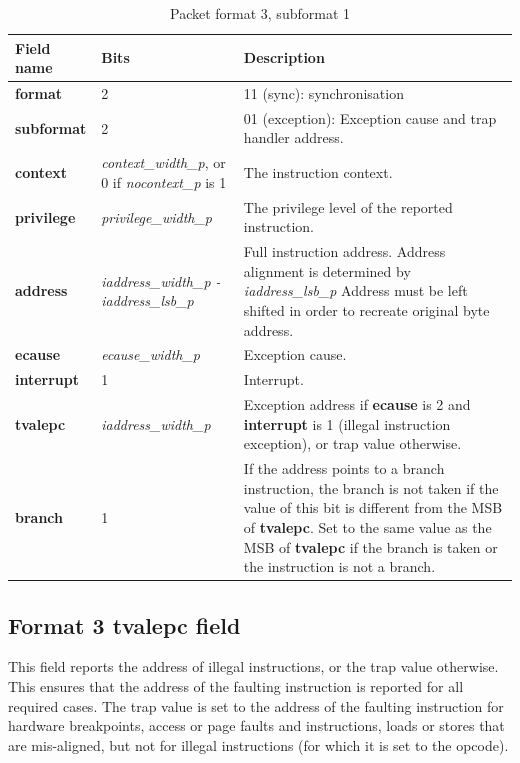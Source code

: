 \begin{table}[htp]
  \centering
  \caption{Packet format 3, subformat 1}
  \label{tab:te_inst3}
  \begin{tabulary}{\textwidth}{|l|p{35mm}|p{90mm}|}
    \hline
    {\bf Field name} & {\bf Bits} & {\bf Description} \\
    \hline
    \textbf{format} & 2 & 11 (sync): synchronisation\\
    \hline
    \textbf{subformat} & 2 & 01 (exception): Exception cause and trap handler address.\\
    \hline
    \textbf{context} &  \textit {context\_width\_p}, 
               or 0 if \textit {nocontext\_p} is 1 & 
               The instruction context. \\
    \hline
    \textbf{privilege} & \textit {privilege\_width\_p} & 
                The privilege level of the reported instruction.\\
    \hline
    \textbf{address} & \textit {iaddress\_width\_p - iaddress\_lsb\_p} & 
              Full instruction address.  Address alignment is determined by \textit {iaddress\_lsb\_p} Address must be left shifted in order to recreate original byte address. \\
    \hline
    \textbf{ecause} & \textit {ecause\_width\_p} & 
             Exception cause. \\
    \hline
    \textbf{interrupt} & 1 & 
                Interrupt. \\
    \hline
    \textbf{tvalepc} & \textit {iaddress\_width\_p} & 
           Exception address if \textbf{ecause} is 2 and \textbf{interrupt} is 1 (illegal instruction exception), or trap value otherwise.\\
    \hline
    \textbf{branch} & 1 & If the address points to a branch instruction, the branch is not taken if the value of this bit is different from the MSB of \textbf{tvalepc}. 
    Set to the same value as the MSB of \textbf{tvalepc} if the branch is taken or the instruction is not a branch. \\
    \hline
  \end{tabulary}
\end{table}

\subsection{Format 3 \textbf{tvalepc} field}

This field reports the address of illegal instructions, or the trap value otherwise.  This ensures that
the address of the faulting instruction is reported for all required cases.  The trap value 
is set to the address of the faulting instruction for hardware breakpoints, access or page faults and 
instructions, loads or stores that are mis-aligned, but not for illegal instructions (for which it is set to the opcode).

